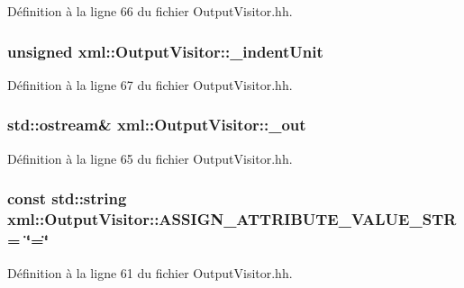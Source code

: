 Définition à la ligne 66 du fichier OutputVisitor.hh.

\hypertarget{classxml_1_1_output_visitor_a55060d8246a1365089872aa4a500b03c}{
\subsubsection[{\_\-indentUnit}]{\setlength{\rightskip}{0pt plus 5cm}unsigned {\bf xml::OutputVisitor::\_\-indentUnit}}}
\label{classxml_1_1_output_visitor_a55060d8246a1365089872aa4a500b03c}


Définition à la ligne 67 du fichier OutputVisitor.hh.

\hypertarget{classxml_1_1_output_visitor_ab2e31d8a9675f88d96a89399ea894e83}{
\subsubsection[{\_\-out}]{\setlength{\rightskip}{0pt plus 5cm}std::ostream\& {\bf xml::OutputVisitor::\_\-out}}}
\label{classxml_1_1_output_visitor_ab2e31d8a9675f88d96a89399ea894e83}


Définition à la ligne 65 du fichier OutputVisitor.hh.

\hypertarget{classxml_1_1_output_visitor_a7eb4bfa043240d8d87fe47eb733057c4}{
\subsubsection[{ASSIGN\_\-ATTRIBUTE\_\-VALUE\_\-STR}]{\setlength{\rightskip}{0pt plus 5cm}const std::string {\bf xml::OutputVisitor::ASSIGN\_\-ATTRIBUTE\_\-VALUE\_\-STR} = \char`\"{}=\char`\"{}}}
\label{classxml_1_1_output_visitor_a7eb4bfa043240d8d87fe47eb733057c4}


Définition à la ligne 61 du fichier OutputVisitor.hh.


